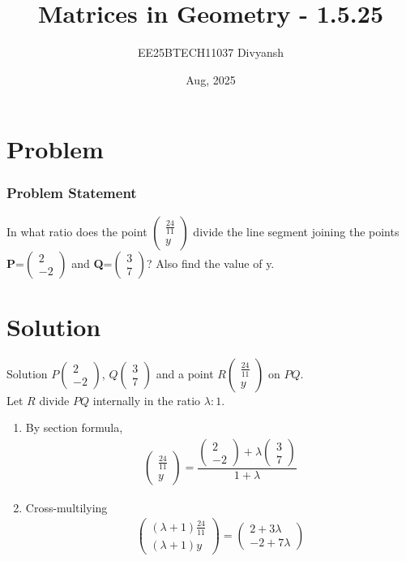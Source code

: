 \documentclass{beamer}
\title{Matrices in Geometry - 1.5.25}
\author{EE25BTECH11037  Divyansh}
\date{Aug, 2025}
\providecommand{\brak}[1]{\ensuremath{\left(#1\right)}}
\theoremstyle{remark}
\newcommand{\myvec}[1]{\ensuremath{\begin{pmatrix}#1\end{pmatrix}}}
\begin{document}
\maketitle

\begin{frame}
\tableofcontents
\end{frame}
\section{Problem}
\begin{frame}
\frametitle{Problem Statement}
In what ratio does the point \myvec{\frac{24}{11} \\ y} divide the line segment joining the points \textbf{P}=\myvec{2 \\ -2} and \textbf{Q}=\myvec{3 \\ 7}? Also find the value of y.

\end{frame}

\section{Solution}
\begin{frame}{Solution}
   $P\myvec{2\\-2}$, $Q\myvec{3\\7}$ and a point $R  \myvec{\frac{24}{11} \\ y}$ on $PQ$. \\
   Let $R$ divide $PQ$ internally in the ratio $\lambda:1$.\\

   \begin{enumerate}[label=\alph*)]
       \item By section formula,
       \begin{align*}
            \myvec{\frac{24}{11} \\ y}= \dfrac{\myvec{2 \\ -2} + \lambda\myvec{3 \\ 7}}{1+\lambda}
        \end{align*}
        \item Cross-multilying
        \begin{align*}
            \myvec{\brak{\lambda+1}\frac{24}{11} \\ \brak{\lambda+1}y}= \myvec{2+3\lambda \\ -2+7\lambda}
        \end{align*}
   \end{enumerate}
\end{frame}
\end{document}
